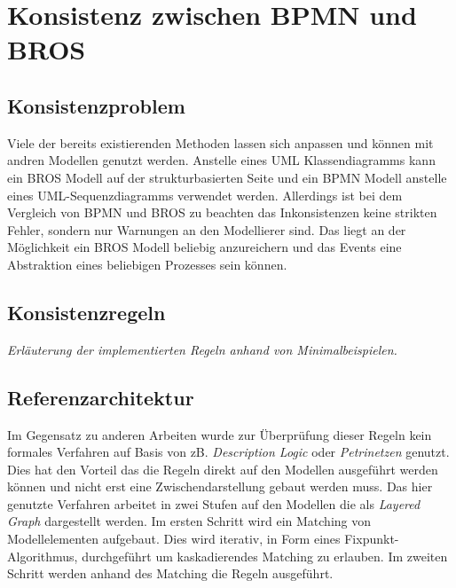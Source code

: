 \chapter{Konsistenz zwischen BPMN und BROS}

\section{Konsistenzproblem}

Viele der bereits existierenden Methoden lassen sich anpassen und können mit andren Modellen genutzt werden. Anstelle eines UML Klassendiagramms kann ein BROS Modell auf der strukturbasierten Seite und ein BPMN Modell anstelle eines UML-Sequenzdiagramms verwendet werden.
Allerdings ist bei dem Vergleich von BPMN und BROS zu beachten das Inkonsistenzen keine strikten Fehler, sondern nur Warnungen an den Modellierer sind.
Das liegt an der Möglichkeit ein BROS Modell beliebig anzureichern und das Events eine Abstraktion eines beliebigen Prozesses sein können.

\section{Konsistenzregeln}

\textit{Erläuterung der implementierten Regeln anhand von Minimalbeispielen.}

\section{Referenzarchitektur}

Im Gegensatz zu anderen Arbeiten wurde zur Überprüfung dieser Regeln kein formales Verfahren auf Basis von zB. \emph{Description Logic} oder \emph{Petrinetzen} genutzt.
Dies hat den Vorteil das die Regeln direkt auf den Modellen ausgeführt werden können und nicht erst eine Zwischendarstellung gebaut werden muss.
Das hier genutzte Verfahren arbeitet in zwei Stufen auf den Modellen die als \emph{Layered Graph} dargestellt werden.
Im ersten Schritt wird ein Matching von Modellelementen aufgebaut. Dies wird iterativ, in Form eines Fixpunkt-Algorithmus, durchgeführt um kaskadierendes Matching zu erlauben.
Im zweiten Schritt werden anhand des Matching die Regeln ausgeführt.
